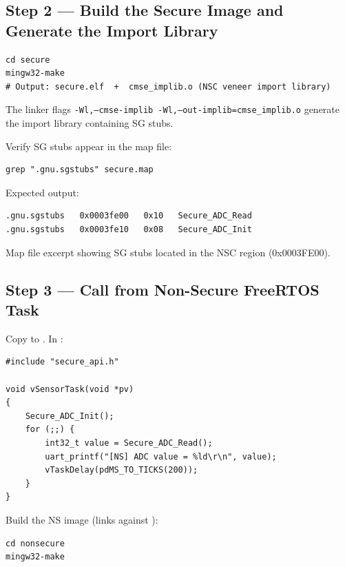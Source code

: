 \documentclass[11pt, a4paper]{article}
\begin{document}
\subsection{Step 2 --- Build the Secure Image and Generate the Import Library}

\begin{lstlisting}[style=bashstyle]
cd secure
mingw32-make
# Output: secure.elf  +  cmse_implib.o (NSC veneer import library)
\end{lstlisting}

The linker flags \texttt{-Wl,\allowbreak--cmse-implib -Wl,\allowbreak--out-implib=cmse\_implib.o}
generate the import library containing SG stubs.

Verify SG stubs appear in the map file:

\begin{lstlisting}[style=bashstyle]
grep ".gnu.sgstubs" secure.map
\end{lstlisting}

Expected output:
\begin{lstlisting}[style=textstyle]
.gnu.sgstubs   0x0003fe00   0x10   Secure_ADC_Read
.gnu.sgstubs   0x0003fe10   0x08   Secure_ADC_Init
\end{lstlisting}

\begin{checkpointbox}[~B1]
  Map file excerpt showing SG stubs located in the NSC region (0x0003FE00).
\end{checkpointbox}

\subsection{Step 3 --- Call from Non-Secure FreeRTOS Task}

Copy  to . In :

\begin{lstlisting}[style=cstyle]
#include "secure_api.h"

void vSensorTask(void *pv)
{
    Secure_ADC_Init();
    for (;;) {
        int32_t value = Secure_ADC_Read();
        uart_printf("[NS] ADC value = %ld\r\n", value);
        vTaskDelay(pdMS_TO_TICKS(200));
    }
}
\end{lstlisting}

Build the NS image (links against ):

\begin{lstlisting}[style=bashstyle]
cd nonsecure
mingw32-make
\end{lstlisting}
\end{document}
